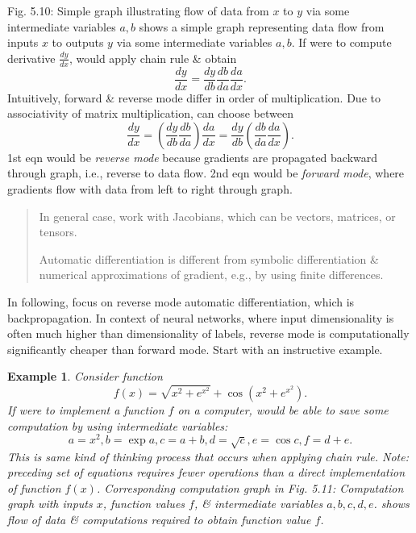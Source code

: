 \documentclass{article}
\newtheorem{example}{Example}
\begin{document}
\begin{itemize}
\begin{itemize}
\begin{itemize}
			{\sf Fig. 5.10: Simple graph illustrating flow of data from $x$ to $y$ via some intermediate variables $a,b$} shows a simple graph representing data flow from inputs $x$ to outputs $y$ via some intermediate variables $a,b$. If were to compute derivative $\frac{dy}{dx}$, would apply chain rule \& obtain
			\begin{equation}
				\frac{dy}{dx} = \frac{dy}{db}\frac{db}{da}\frac{da}{dx}.
			\end{equation}
			Intuitively, forward \& reverse mode differ in order of multiplication. Due to associativity of matrix multiplication, can choose between
			\begin{equation}
				\frac{dy}{dx} = \left(\frac{dy}{db}\frac{db}{da}\right)\frac{da}{dx} = \frac{dy}{db}\left(\frac{db}{da}\frac{da}{dx}\right).
			\end{equation}
			1st eqn would be {\it reverse mode} because gradients are propagated backward through graph, i.e., reverse to data flow. 2nd eqn would be {\it forward mode}, where gradients flow with data from left to right through graph.
			\begin{quote}
				In general case, work with Jacobians, which can be vectors, matrices, or tensors.
				
				Automatic differentiation is different from symbolic differentiation \& numerical approximations of gradient, e.g., by using finite differences.
			\end{quote}
			In following, focus on reverse mode automatic differentiation, which is backpropagation. In context of neural networks, where input dimensionality is often much higher than dimensionality of labels, reverse mode is computationally significantly cheaper than forward mode. Start with an instructive example.
			\begin{example}
				Consider function
				\begin{equation}
					f(x) = \sqrt{x^2 + e^{x^2}} + \cos\left(x^2 + e^{x^2}\right).
				\end{equation}
				If were to implement a function $f$ on a computer, would be able to save some computation by using {\it intermediate variables}:
				\begin{equation}
					a = x^2,b = \exp a,c = a + b,d = \sqrt{c},e = \cos c,f = d + e.
				\end{equation}
				This is same kind of thinking process that occurs when applying chain rule. Note: preceding set of equations requires fewer operations than a direct implementation of function $f(x)$. Corresponding computation graph in {\sf Fig. 5.11: Computation graph with inputs $x$, function values $f$, \& intermediate variables $a,b,c,d,e$.} shows flow of data \& computations required to obtain function value $f$.
				

\end{example}
\end{itemize}
\end{itemize}
\end{itemize}
\end{document}
